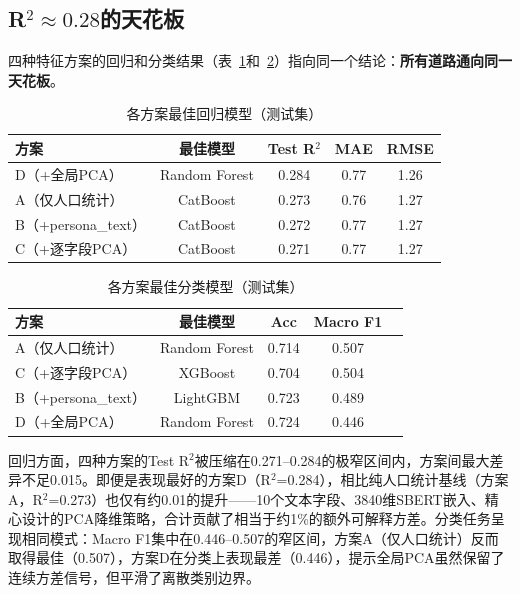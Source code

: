 \documentclass[11pt,a4paper]{ctexart}
\begin{document}
\subsection{R$^2\approx 0.28$的天花板}

四种特征方案的回归和分类结果（表~\ref{tab:regression_best}和~\ref{tab:classification_best}）指向同一个结论：\textbf{所有道路通向同一天花板}。

\begin{table}[H]
    \centering
    \caption{各方案最佳回归模型（测试集）}
    \label{tab:regression_best}
    \begin{tabular}{@{}lcccc@{}}
        \toprule
        \textbf{方案} & \textbf{最佳模型} & \textbf{Test R$^2$} & \textbf{MAE} & \textbf{RMSE} \\
        \midrule
        D（+全局PCA） & Random Forest & 0.284 & 0.77 & 1.26 \\
        A（仅人口统计） & CatBoost & 0.273 & 0.76 & 1.27 \\
        B（+persona\_text） & CatBoost & 0.272 & 0.77 & 1.27 \\
        C（+逐字段PCA） & CatBoost & 0.271 & 0.77 & 1.27 \\
        \bottomrule
    \end{tabular}
\end{table}

\begin{table}[H]
    \centering
    \caption{各方案最佳分类模型（测试集）}
    \label{tab:classification_best}
    \begin{tabular}{@{}lcccc@{}}
        \toprule
        \textbf{方案} & \textbf{最佳模型} & \textbf{Acc} & \textbf{Macro F1} \\
        \midrule
        A（仅人口统计） & Random Forest & 0.714 & 0.507 \\
        C（+逐字段PCA） & XGBoost & 0.704 & 0.504 \\
        B（+persona\_text） & LightGBM & 0.723 & 0.489 \\
        D（+全局PCA） & Random Forest & 0.724 & 0.446 \\
        \bottomrule
    \end{tabular}
\end{table}

回归方面，四种方案的Test R$^2$被压缩在0.271--0.284的极窄区间内，方案间最大差异不足0.015。即便是表现最好的方案D（R$^2$=0.284），相比纯人口统计基线（方案A，R$^2$=0.273）也仅有约0.01的提升——10个文本字段、3840维SBERT嵌入、精心设计的PCA降维策略，合计贡献了相当于约1\%的额外可解释方差。分类任务呈现相同模式：Macro F1集中在0.446--0.507的窄区间，方案A（仅人口统计）反而取得最佳（0.507），方案D在分类上表现最差（0.446），提示全局PCA虽然保留了连续方差信号，但平滑了离散类别边界。
\end{document}

